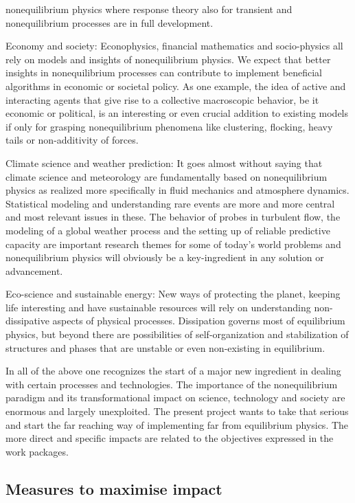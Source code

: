 \begin{compactitem}
  nonequilibrium physics where response theory also for transient and nonequilibrium
  processes are in full development.
\item Economy and society: Econophysics, financial mathematics and socio-physics all rely on
  models and insights of nonequilibrium physics. We expect that better insights in
  nonequilibrium processes can contribute to implement beneficial algorithms in economic or
  societal policy.  As one example, the idea of active and interacting agents that give rise
  to a collective macroscopic behavior, be it economic or political, is an interesting or
  even crucial addition to existing models if only for grasping nonequilibrium phenomena
  like clustering, flocking, heavy tails or non-additivity of forces.
\item Climate science and weather prediction: It goes almost without saying that climate
  science and meteorology are fundamentally based on nonequilibrium physics as realized more
  specifically in fluid mechanics and atmosphere dynamics. Statistical modeling and
  understanding rare events are more and more central and most relevant issues in these. The
  behavior of probes in turbulent flow, the modeling of a global weather process and the
  setting up of reliable predictive capacity are important research themes for some of
  today's world problems and nonequilibrium physics will obviously be a key-ingredient in
  any solution or advancement.
\item Eco-science and sustainable energy: New ways of protecting the planet, keeping life
  interesting and have sustainable resources will rely on understanding non-dissipative
  aspects of physical processes.  Dissipation governs most of equilibrium physics, but
  beyond there are possibilities of self-organization and stabilization of structures and
  phases that are unstable or even non-existing in equilibrium.
\end{compactitem}
In all of the above one recognizes the start of a major new ingredient in dealing with
certain processes and technologies. The importance of the nonequilibrium paradigm and its
transformational impact on science, technology and society are enormous and largely
unexploited. The present project wants to take that serious and start the far reaching way
of implementing far from equilibrium physics. The more direct and specific impacts are related to the objectives expressed in the work packages.

\subsection{Measures to maximise impact}

